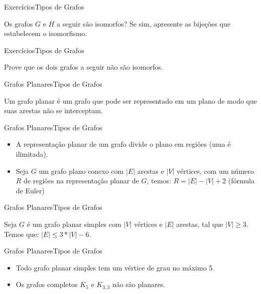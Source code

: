 \documentclass[t]{beamer}
\begin{document}

\begin{ftst}{Exercícios}{Tipos de Grafos}

Os grafos $G$ e $H$ a seguir são isomorfos? Se sim, apresente as bijeções que estabelecem o isomorfismo.

\vone
\centering


\end{ftst}



\begin{ftst}{Exercícios}{Tipos de Grafos}

Prove que os dois grafos a seguir não são isomorfos.

\vone
\centering


\end{ftst}



\begin{ftst}{Grafos Planares}{Tipos de Grafos}

Um grafo planar é um grafo que pode ser representado em um plano de modo que suas arestas não se interceptam.

\vone
\centering


\end{ftst}



\begin{ftst}{Grafos Planares}{Tipos de Grafos}
\begin{itemize}
    \item A representação planar de um grafo divide o plano em regiões (uma é ilimitada).
    \item Seja $G$ um grafo plano conexo com $|E|$ arestas e $|V|$ vértices, com um número $R$ de regiões na representação planar de $G$, temos: $R=|E| - |V|+2$ (fórmula de Euler)
\end{itemize}

\vone
\centering


\end{ftst}



\begin{ftst}{Grafos Planares}{Tipos de Grafos}

Seja $G$ é um grafo planar simples com $|V|$ vértices e $|E|$ arestas, tal que $|V| \geq 3$. Temos que: $|E| \leq 3*|V| - 6$.

\vone
\vone
\vone
\vone

\centering


\end{ftst}



\begin{ftst}{Grafos Planares}{Tipos de Grafos}
\begin{itemize}
    \item Todo grafo planar simples tem um vértice de grau no máximo 5.
    \item Os grafos completos $K_5$ e $K_{3,3}$ não são planares.
\end{itemize}
\vone
\vone
\centering


\end{ftst}


\end{document}
